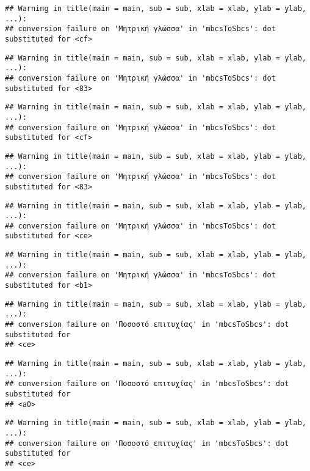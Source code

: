 \documentclass[
]{article}
\begin{document}
\begin{verbatim}
## Warning in title(main = main, sub = sub, xlab = xlab, ylab = ylab, ...):
## conversion failure on 'Μητρική γλώσσα' in 'mbcsToSbcs': dot substituted for <cf>
\end{verbatim}

\begin{verbatim}
## Warning in title(main = main, sub = sub, xlab = xlab, ylab = ylab, ...):
## conversion failure on 'Μητρική γλώσσα' in 'mbcsToSbcs': dot substituted for <83>
\end{verbatim}

\begin{verbatim}
## Warning in title(main = main, sub = sub, xlab = xlab, ylab = ylab, ...):
## conversion failure on 'Μητρική γλώσσα' in 'mbcsToSbcs': dot substituted for <cf>
\end{verbatim}

\begin{verbatim}
## Warning in title(main = main, sub = sub, xlab = xlab, ylab = ylab, ...):
## conversion failure on 'Μητρική γλώσσα' in 'mbcsToSbcs': dot substituted for <83>
\end{verbatim}

\begin{verbatim}
## Warning in title(main = main, sub = sub, xlab = xlab, ylab = ylab, ...):
## conversion failure on 'Μητρική γλώσσα' in 'mbcsToSbcs': dot substituted for <ce>
\end{verbatim}

\begin{verbatim}
## Warning in title(main = main, sub = sub, xlab = xlab, ylab = ylab, ...):
## conversion failure on 'Μητρική γλώσσα' in 'mbcsToSbcs': dot substituted for <b1>
\end{verbatim}

\begin{verbatim}
## Warning in title(main = main, sub = sub, xlab = xlab, ylab = ylab, ...):
## conversion failure on 'Ποσοστό επιτυχίας' in 'mbcsToSbcs': dot substituted for
## <ce>
\end{verbatim}

\begin{verbatim}
## Warning in title(main = main, sub = sub, xlab = xlab, ylab = ylab, ...):
## conversion failure on 'Ποσοστό επιτυχίας' in 'mbcsToSbcs': dot substituted for
## <a0>
\end{verbatim}

\begin{verbatim}
## Warning in title(main = main, sub = sub, xlab = xlab, ylab = ylab, ...):
## conversion failure on 'Ποσοστό επιτυχίας' in 'mbcsToSbcs': dot substituted for
## <ce>
\end{verbatim}
\end{document}
